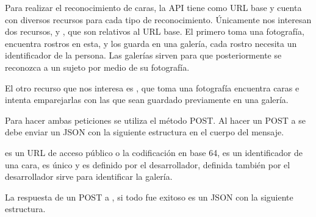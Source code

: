 Para realizar el reconocimiento de caras, la API tiene como URL base
 y cuenta con diversos recursos para cada tipo de
reconocimiento. Únicamente nos interesan dos recursos,  y
, que son relativos al URL base.
El primero toma una fotografía, encuentra rostros en esta,
y los guarda en una galería, cada rostro necesita un identificador de la
persona. Las galerías sirven para que posteriormente se reconozca a un sujeto
por medio de su fotografía.

El otro recurso que nos interesa es , que toma una fotografía
encuentra caras e intenta emparejarlas con las que sean guardado
previamente en una galería.

Para hacer ambas peticiones se utiliza el método POST. Al hacer un POST
a  se debe enviar un JSON con la siguiente estructura en el cuerpo
del mensaje.

\begin{sphinxVerbatim}[commandchars=\\\{\}]
   
   
   
\end{sphinxVerbatim}

 es un URL de acceso público o la codificación en base 64,  es un identificador
de una cara, es único y es definido por el desarrollador, 
definida también por el desarrollador sirve para identificar la galería.

La respuesta de un POST a , si todo fue exitoso
es un JSON con la siguiente estructura.

